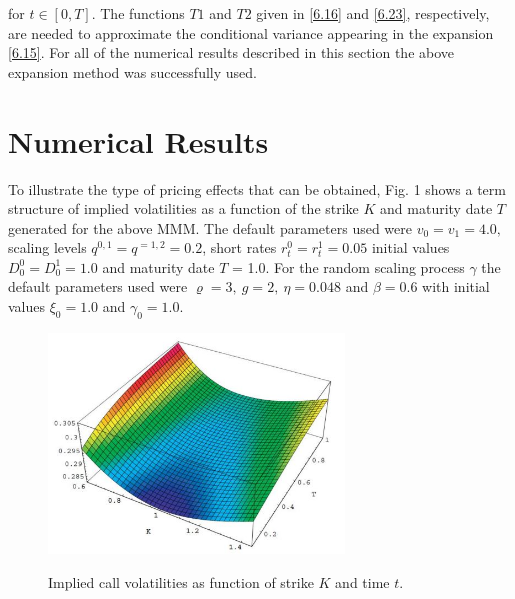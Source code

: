 \documentclass[a4 paper, 12pt]{report}
\theoremstyle{plain}
\begin{document}
for $t \in [0,T].$ The functions $T1$ and $T2$ given in \eqref{6.16}  and \eqref{6.23},
respectively, are needed to approximate the conditional variance appearing in
the expansion \eqref{6.15}. For all of the numerical results described in this section
the above expansion method was successfully used.


\section{Numerical Results}
\noindent
\par To illustrate the type of pricing effects that can be obtained, Fig. 1 shows a term
structure of implied volatilities as a function of the strike $K$ and maturity date $T$
generated for the above MMM. The default parameters used were $v_0 = v_1 =4.0,$\\
scaling levels $q^{0,1} = q^{=1,2} = 0.2$, short rates $r_t^0 = r_t^1 = 0.05$ initial values $D_0^0 = D_0^1 = 1.0$ and maturity date $T$ = 1.0. For the random scaling process $\gamma$ the default parameters used were $\varrho = 3,~g = 2,~\eta = 0.048$ and $\beta = 0.6$ with initial values $\xi_0 = 1.0$ and $\gamma_0 = 1.0.$


\begin{figure}[hp]
	\centering
		\includegraphics[width=0.70\textwidth]{fig1.JPG}
	\label{image1}
	\caption{Implied call volatilities as function of strike $K$ and time $t$.}
\end{figure}
\end{document}
